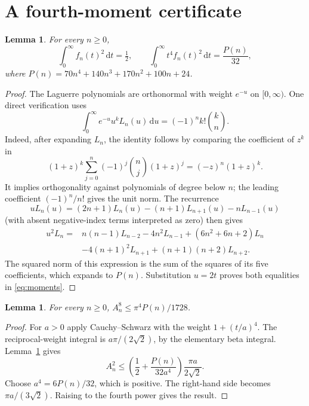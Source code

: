 \documentclass[11pt]{article}
\newtheorem{lemma}[theorem]{Lemma}
\newcommand{\dd}{\,\mathrm d}
\begin{document}
\section{A fourth-moment certificate}
\begin{lemma}\label{lem:moment}
For every $n\geq0$,
\begin{equation}\label{eq:moments}
 \int_0^\infty f_n(t)^2\dd t=\tfrac12,\qquad
 \int_0^\infty t^4 f_n(t)^2\dd t=\frac{P(n)}{32},
\end{equation}
where $P(n)=70n^4+140n^3+170n^2+100n+24$.
\end{lemma}
\begin{proof}
The Laguerre polynomials are orthonormal with weight $e^{-u}$ on $[0,\infty)$. One direct verification uses
\[
 \int_0^\infty e^{-u}u^k L_n(u)\dd u
 =(-1)^n k!\binom{k}{n}.
\]
Indeed, after expanding $L_n$, the identity follows by comparing the coefficient of $z^k$ in
\[
 (1+z)^k\sum_{j=0}^n(-1)^j\binom{n}{j}(1+z)^j=(-z)^n(1+z)^k.
\]
It implies orthogonality against polynomials of degree below $n$; the leading coefficient $(-1)^n/n!$ gives the unit norm. The recurrence
\[
 uL_n(u)=(2n+1)L_n(u)-(n+1)L_{n+1}(u)-nL_{n-1}(u)
\]
(with absent negative-index terms interpreted as zero) then gives
\begin{align*}
 u^2L_n={}&n(n-1)L_{n-2}-4n^2L_{n-1}+(6n^2+6n+2)L_n\\
 &-4(n+1)^2L_{n+1}+(n+1)(n+2)L_{n+2}.
\end{align*}
The squared norm of this expression is the sum of the squares of its five coefficients, which expands to $P(n)$. Substitution $u=2t$ proves both equalities in \eqref{eq:moments}.
\end{proof}

\begin{lemma}\label{lem:upper}
For every $n\geq0$, $A_n^8\leq \pi^4 P(n)/1728$.
\end{lemma}
\begin{proof}
For $a>0$ apply Cauchy--Schwarz with the weight $1+(t/a)^4$. The reciprocal-weight integral is $a\pi/(2\sqrt2)$, by the elementary beta integral. Lemma~\ref{lem:moment} gives
\[
 A_n^2\leq\left(\frac12+\frac{P(n)}{32a^4}\right)\frac{\pi a}{2\sqrt2}.
\]
Choose $a^4=6P(n)/32$, which is positive. The right-hand side becomes $\pi a/(3\sqrt2)$. Raising to the fourth power gives the result.
\end{proof}
\end{document}
